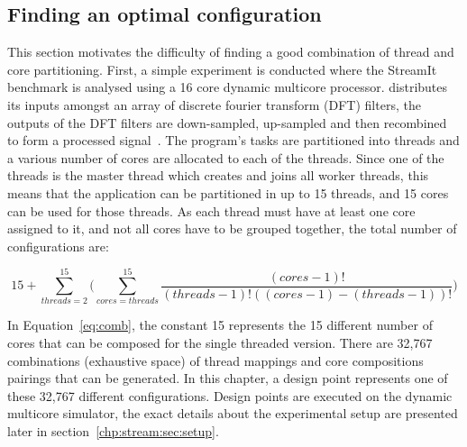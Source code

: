 \subsection{Finding an optimal configuration}
This section motivates the difficulty of finding a good combination of thread and core partitioning.
First, a simple experiment is conducted where the  StreamIt benchmark is analysed using a 16 core dynamic multicore processor.
 distributes its inputs amongst an array of discrete fourier transform (DFT) filters, the outputs of the DFT filters are down-sampled, up-sampled and then recombined to form a processed signal~\cite{streamitrepo}.
The program's tasks are partitioned into threads and a various number of cores are allocated to each of the threads.
Since one of the threads is the master thread which creates and joins all worker threads, this means that the application can be partitioned in up to 15 threads, and 15 cores can be used for those threads.
As each thread must have at least one core assigned to it, and not all cores have to be grouped together, the total number of configurations are:

\begin{equation}
15 + \sum_{threads=2}^{15} \bigg( \sum_{cores=threads}^{15} \frac{(cores-1)!}{(threads-1)!((cores-1)-(threads-1))!}\bigg)
\label{eq:comb}
\end{equation}

In Equation~\ref{eq:comb}, the constant 15 represents the 15 different number of cores that can be composed for the single threaded version.
There are 32,767 combinations (exhaustive space) of thread mappings and core compositions pairings that can be generated.
In this chapter, a design point represents one of these 32,767 different configurations.
Design points are executed on the dynamic multicore simulator, the exact details about the experimental setup are presented later in section~\ref{chp:stream:sec:setup}.

